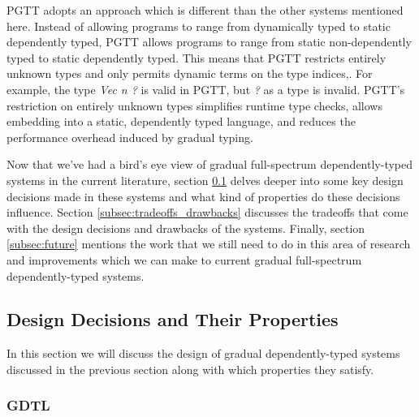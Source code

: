 \documentclass{article}
\newcommand{\Gcode}[1]{{\color{OliveGreen}\textit{#1}}}
\begin{document}
PGTT adopts an approach which is different than the other systems mentioned
here. Instead of allowing programs to range from dynamically typed to static
dependently typed, PGTT allows programs to range from static non-dependently
typed to static dependently typed. This means that PGTT restricts entirely
unknown types and only permits dynamic terms on the type indices,. For example,
the type \Gcode{Vec n ?} is valid in PGTT, but \Gcode{?} as a type is invalid.
PGTT's restriction on entirely unknown types simplifies runtime type checks,
allows embedding into a static, dependently typed language, and reduces the
performance overhead induced by gradual typing.

Now that we've had a bird's eye view of gradual full-spectrum dependently-typed
systems in the current literature, section \ref{subsec:design_properties} delves
deeper into some key design decisions made in these systems and what kind of
properties do these decisions influence. Section
\ref{subsec:tradeoffs_drawbacks} discusses the tradeoffs that come with the
design decisions and drawbacks of the systems. Finally, section
\ref{subsec:future} mentions the work that we still need to do in this area of
research and improvements which we can make to current gradual full-spectrum
dependently-typed systems.

\subsection{Design Decisions and Their Properties}\label{subsec:design_properties}

In this section we will discuss the design of gradual dependently-typed systems
discussed in the previous section along with which properties they satisfy.

\subsubsection{GDTL}
\end{document}
